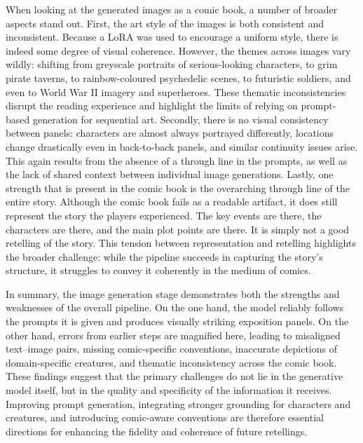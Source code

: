 When looking at the generated images as a comic book, a number of broader aspects stand out. First, the art style of the images is both consistent and inconsistent. Because a LoRA was used to encourage a uniform style, there is indeed some degree of visual coherence. However, the themes across images vary wildly: shifting from greyscale portraits of serious-looking characters, to grim pirate taverns, to rainbow-coloured psychedelic scenes, to futuristic soldiers, and even to World War II imagery and superheroes. These thematic inconsistencies disrupt the reading experience and highlight the limits of relying on prompt-based generation for sequential art. Secondly, there is no visual consistency between panels: characters are almost always portrayed differently, locations change drastically even in back-to-back panels, and similar continuity issues arise. This again results from the absence of a through line in the prompts, as well as the lack of shared context between individual image generations. Lastly, one strength that is present in the comic book is the overarching through line of the entire story. Although the comic book fails as a readable artifact, it does still represent the story the players experienced. The key events are there, the characters are there, and the main plot points are there. It is simply not a good retelling of the story. This tension between representation and retelling highlights the broader challenge: while the pipeline succeeds in capturing the story's structure, it struggles to convey it coherently in the medium of comics.

In summary, the image generation stage demonstrates both the strengths and weaknesses of the overall pipeline. On the one hand, the model reliably follows the prompts it is given and produces visually striking exposition panels. On the other hand, errors from earlier steps are magnified here, leading to misaligned text–image pairs, missing comic-specific conventions, inaccurate depictions of domain-specific creatures, and thematic inconsistency across the comic book. These findings suggest that the primary challenges do not lie in the generative model itself, but in the quality and specificity of the information it receives. Improving prompt generation, integrating stronger grounding for characters and creatures, and introducing comic-aware conventions are therefore essential directions for enhancing the fidelity and coherence of future retellings.

